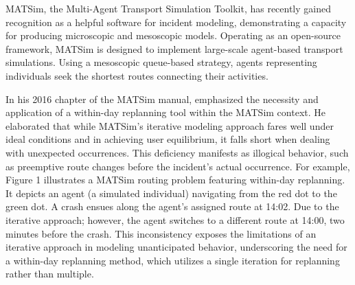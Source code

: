 \documentclass[
  letterpaper,
  authoryear]{elsarticle}
\begin{document}
MATSim, the Multi-Agent Transport Simulation Toolkit, has recently
gained recognition as a helpful software for incident modeling,
demonstrating a capacity for producing microscopic and mesoscopic
models. Operating as an open-source framework, MATSim is designed to
implement large-scale agent-based transport simulations. Using a
mesoscopic queue-based strategy, agents representing individuals seek
the shortest routes connecting their activities.

In his 2016 chapter of the MATSim manual, \citet{dobler2016} emphasized
the necessity and application of a within-day replanning tool within the
MATSim context. He elaborated that while MATSim's iterative modeling
approach fares well under ideal conditions and in achieving user
equilibrium, it falls short when dealing with unexpected occurrences.
This deficiency manifests as illogical behavior, such as preemptive
route changes before the incident's actual occurrence. For example,
Figure 1 illustrates a MATSim routing problem featuring within-day
replanning. It depicts an agent (a simulated individual) navigating from
the red dot to the green dot. A crash ensues along the agent's assigned
route at 14:02. Due to the iterative approach; however, the agent
switches to a different route at 14:00, two minutes before the crash.
This inconsistency exposes the limitations of an iterative approach in
modeling unanticipated behavior, underscoring the need for a within-day
replanning method, which utilizes a single iteration for replanning
rather than multiple.
\end{document}
